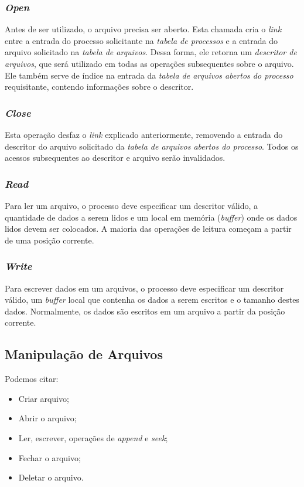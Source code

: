 \subsubsection{\textit{Open}}
Antes de ser utilizado, o arquivo precisa ser aberto. Esta chamada cria o \textit{link} entre a entrada do processo solicitante na \textit{tabela de processos} e a entrada do arquivo solicitado na \textit{tabela de arquivos}. Dessa forma, ele retorna um \textit{descritor de arquivos}, que será utilizado em todas as operações subsequentes sobre o arquivo. Ele também serve de índice na entrada da \textit{tabela de arquivos abertos do processo} requisitante, contendo informações sobre o descritor.


\subsubsection{\textit{Close}}
Esta operação desfaz o \textit{link} explicado anteriormente, removendo a entrada do descritor do arquivo solicitado da \textit{tabela de arquivos abertos do processo}. Todos os acessos subsequentes ao descritor e arquivo serão invalidados.


\subsubsection{\textit{Read}}
Para ler um arquivo, o processo deve especificar um descritor válido, a quantidade de dados a serem lidos e um local em memória (\textit{buffer}) onde os dados lidos devem ser colocados. A maioria das operações de leitura começam a partir de uma posição corrente.

\subsubsection{\textit{Write}}
Para escrever dados em um arquivos, o processo deve especificar um descritor válido, um \textit{buffer} local que contenha os dados a serem escritos e o tamanho destes dados. Normalmente, os dados são escritos em um arquivo a partir da posição corrente.

\subsection{Manipulação de Arquivos}
Podemos citar:
\begin{itemize}
  \item Criar arquivo;
  \item Abrir o arquivo;
  \item Ler, escrever, operações de \textit{append} e \textit{seek};
  \item Fechar o arquivo;
  \item Deletar o arquivo.
\end{itemize}










